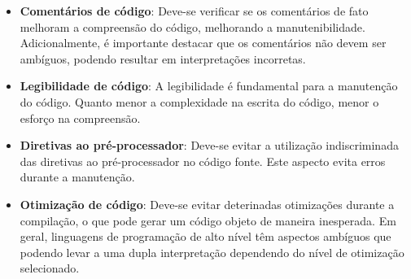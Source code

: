 \begin{itemize}
	\item \textbf{Comentários de código}: Deve-se verificar se os comentários de fato melhoram a compreensão do código, melhorando a manutenibilidade. Adicionalmente, é importante destacar que os comentários não devem ser ambíguos, podendo resultar em interpretações incorretas.

	\item \textbf{Legibilidade de código}: A legibilidade é fundamental para a manutenção do código. Quanto menor a complexidade na escrita do código, menor o esforço na compreensão.

	\item \textbf{Diretivas ao pré-processador}: Deve-se evitar a utilização indiscriminada das diretivas ao pré-processador no código fonte. Este aspecto evita erros durante a manutenção.

	\item \textbf{Otimização de código}: Deve-se evitar deterinadas otimizações durante a compilação, o que pode gerar um código objeto de maneira inesperada. Em geral, linguagens de programação de alto nível têm aspectos ambíguos que podendo levar a uma dupla interpretação dependendo do nível de otimização selecionado.
\end{itemize}